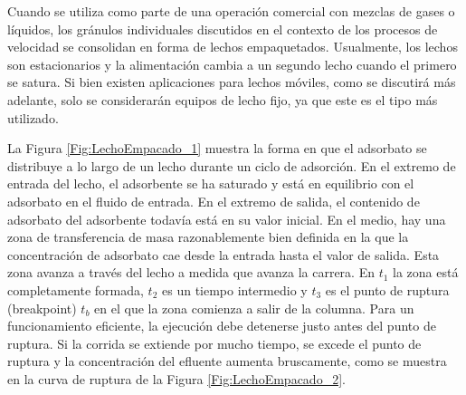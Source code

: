 \documentclass[11pt]{book}
\begin{document}
Cuando se utiliza como parte de una operación comercial con mezclas de gases o líquidos, los gránulos individuales discutidos en el contexto de los procesos de velocidad se consolidan en forma de lechos empaquetados. Usualmente, los lechos son estacionarios y la alimentación cambia a un segundo lecho cuando el primero se satura. Si bien existen aplicaciones para lechos móviles, como se discutirá más adelante, solo se considerarán equipos de lecho fijo, ya que este es el tipo más utilizado.

La Figura \ref{Fig:LechoEmpacado_1} muestra la forma en que el adsorbato se distribuye a lo largo de un lecho durante un ciclo de adsorción. En el extremo de entrada del lecho, el adsorbente se ha saturado y está en equilibrio con el adsorbato en el fluido de entrada. En el extremo de salida, el contenido de adsorbato del adsorbente todavía está en su valor inicial. En el medio, hay una zona de transferencia de masa razonablemente bien definida en la que la concentración de adsorbato cae desde la entrada hasta el valor de salida. Esta zona avanza a través del lecho a medida que avanza la carrera. En $t_1$ la zona está completamente formada, $t_2$ es un tiempo intermedio y $t_3$ es el punto de ruptura (breakpoint) $t_b$ en el que la zona comienza a salir de la columna. Para un funcionamiento eficiente, la ejecución debe detenerse justo antes del punto de ruptura. Si la corrida se extiende por mucho tiempo, se excede el punto de ruptura y la concentración del efluente aumenta bruscamente, como se muestra en la curva de ruptura de la Figura \ref{Fig:LechoEmpacado_2}.
\end{document}
